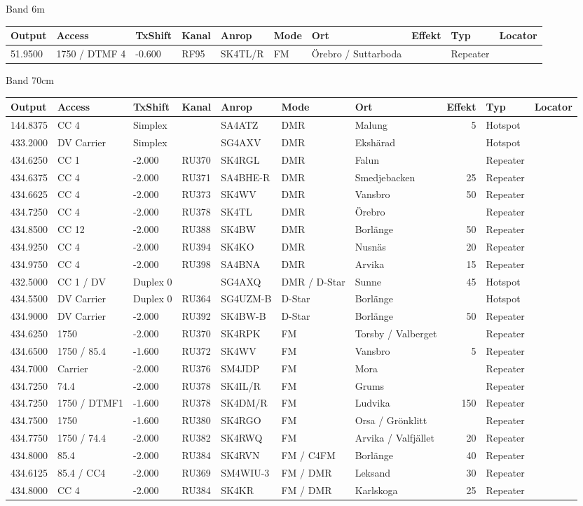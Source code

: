 \large{Band 6m}
\begin{longtable}{lllllllrlr}
Output & Access & TxShift & Kanal & Anrop & Mode & Ort & Effekt & Typ & Locator \\ \hline
51.9500&1750 / DTMF 4&-0.600&RF95&SK4TL/R&FM&Örebro / Suttarboda&&Repeater&\\
\end{longtable}
\large{Band 70cm}
\begin{longtable}{lllllllrlr}
Output & Access & TxShift & Kanal & Anrop & Mode & Ort & Effekt & Typ & Locator \\ \hline
144.8375&CC 4&Simplex&&SA4ATZ&DMR&Malung&5&Hotspot&\\
433.2000&DV Carrier&Simplex&&SG4AXV&DMR&Ekshärad&&Hotspot&\\
434.6250&CC 1&-2.000&RU370&SK4RGL&DMR&Falun&&Repeater&\\
434.6375&CC 4&-2.000&RU371&SA4BHE-R&DMR&Smedjebacken&25&Repeater&\\
434.6625&CC 4&-2.000&RU373&SK4WV&DMR&Vansbro&50&Repeater&\\
434.7250&CC 4&-2.000&RU378&SK4TL&DMR&Örebro&&Repeater&\\
434.8500&CC 12&-2.000&RU388&SK4BW&DMR&Borlänge&50&Repeater&\\
434.9250&CC 4&-2.000&RU394&SK4KO&DMR&Nusnäs&20&Repeater&\\
434.9750&CC 4&-2.000&RU398&SA4BNA&DMR&Arvika&15&Repeater&\\
432.5000&CC 1 / DV&Duplex 0&&SG4AXQ&DMR / D-Star&Sunne&45&Hotspot&\\
434.5500&DV Carrier&Duplex 0&RU364&SG4UZM-B&D-Star&Borlänge&&Hotspot&\\
434.9000&DV Carrier&-2.000&RU392&SK4BW-B&D-Star&Borlänge&50&Repeater&\\
434.6250&1750&-2.000&RU370&SK4RPK&FM&Torsby / Valberget&&Repeater&\\
434.6500&1750 / 85.4&-1.600&RU372&SK4WV&FM&Vansbro&5&Repeater&\\
434.7000&Carrier&-2.000&RU376&SM4JDP&FM&Mora&&Repeater&\\
434.7250&74.4&-2.000&RU378&SK4IL/R&FM&Grums&&Repeater&\\
434.7250&1750 / DTMF1&-1.600&RU378&SK4DM/R&FM&Ludvika&150&Repeater&\\
434.7500&1750&-1.600&RU380&SK4RGO&FM&Orsa / Grönklitt&&Repeater&\\
434.7750&1750 / 74.4&-2.000&RU382&SK4RWQ&FM&Arvika / Valfjället&20&Repeater&\\
434.8000&85.4&-2.000&RU384&SK4RVN&FM / C4FM&Borlänge&40&Repeater&\\
434.6125&85.4 / CC4&-2.000&RU369&SM4WIU-3&FM / DMR&Leksand&30&Repeater&\\
434.8000&CC 4&-2.000&RU384&SK4KR&FM / DMR&Karlskoga&25&Repeater&\\
\end{longtable}
\clearpage
